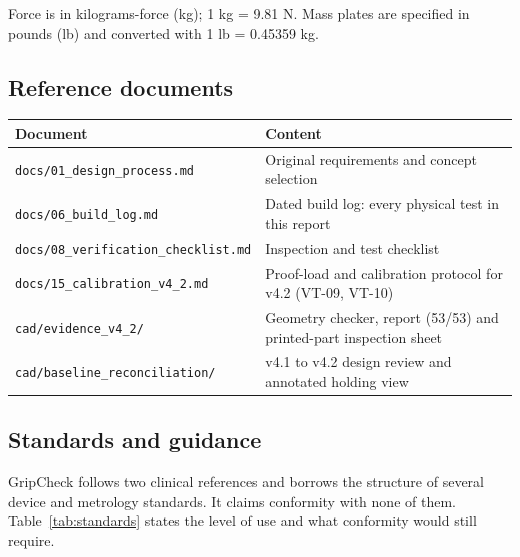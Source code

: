 \documentclass[10pt,a4paper]{article}
\begin{document}
\smallskip
Force is in kilograms-force (kg); 1 kg = 9.81 N. Mass plates are specified in pounds (lb) and converted with 1 lb = 0.45359 kg.

\subsection{Reference documents}
\noindent
\begin{tabularx}{\linewidth}{@{}p{5.6cm}L@{}}
\toprule
Document & Content \\
\midrule
\texttt{docs/01\_design\_process.md} & Original requirements and concept selection \\
\texttt{docs/06\_build\_log.md} & Dated build log: every physical test in this report \\
\texttt{docs/08\_verification\_checklist.md} & Inspection and test checklist \\
\texttt{docs/15\_calibration\_v4\_2.md} & Proof-load and calibration protocol for v4.2 (VT-09, VT-10) \\
\texttt{cad/evidence\_v4\_2/} & Geometry checker, report (53/53) and printed-part inspection sheet \\
\texttt{cad/baseline\_reconciliation/} & v4.1 to v4.2 design review and annotated holding view \\
\bottomrule
\end{tabularx}

\subsection{Standards and guidance}
GripCheck follows two clinical references and borrows the structure of several device and metrology standards. It claims conformity with none of them. Table~\ref{tab:standards} states the level of use and what conformity would still require.
\end{document}
